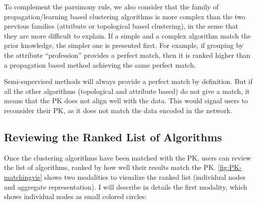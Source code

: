 To complement the parsimony rule, we also consider that the family of propagation/learning based clustering algorithms is more complex than the two previous families (attribute or topological based clustering), in the sense that they are more difficult to explain.
If a simple and a complex algorithm match the prior knowledge, the simpler one is presented first. For example, if grouping by the attribute ``profession'' provides a perfect match, then it is ranked higher than a propagation based method achieving the same perfect match.

Semi-supervised methods will always provide a perfect match by definition. But if all the other algorithms (topological and attribute based) do not give a match, it means that the PK does not align well with the data. This would signal users to reconsider their PK, as it does not match the data encoded in the network.

\subsection{Reviewing the Ranked List of Algorithms}


Once the clustering algorithms have been matched with the PK, users can review the list of algorithms, ranked by how well their results match the PK.
\autoref{fig:PK-matchingvis} shows two modalities to visualize the ranked list (individual nodes and aggregate representation).
I will describe in details the first modality, which shows individual nodes as small colored circles:

%


